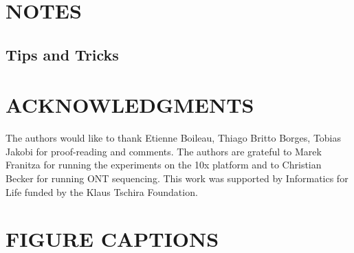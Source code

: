 \documentclass[times, 11pt, a4paper]{article}
\begin{document}
\section*{NOTES}
\subsection*{Tips and Tricks}

\section*{ACKNOWLEDGMENTS}
  The authors would like to thank Etienne Boileau, Thiago Britto Borges, Tobias Jakobi for proof-reading and comments.
  The authors are grateful to Marek Franitza for running the experiments on the 10x platform and to Christian Becker for running ONT sequencing.
  This work was supported by Informatics for Life funded by the Klaus Tschira Foundation.

 

\newpage

\section*{FIGURE CAPTIONS}
\end{document}
